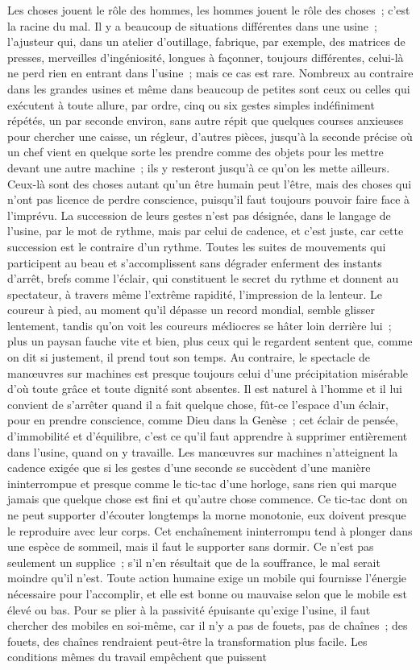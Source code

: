 \documentclass[french,twoside]{book} %
\begin{document}
Les choses jouent le rôle des hommes, les hommes jouent le rôle des choses ; c'est la racine du mal. Il y a beaucoup de situations différentes dans une usine ; l'ajusteur qui, dans un atelier d'outillage, fabrique, par exemple, des matrices de presses, merveilles d'ingéniosité, longues à façonner, toujours différentes, celui-là ne perd rien en entrant dans l'usine ; mais ce cas est rare. Nombreux au contraire dans les grandes usines et même dans beaucoup de petites sont ceux ou celles qui exécutent à toute allure, par ordre, cinq ou six gestes simples indéfiniment répétés, un par seconde environ, sans autre répit que quelques courses anxieuses pour chercher une caisse, un régleur, d'autres pièces, jusqu'à la seconde précise où un chef vient en quelque sorte les prendre comme des objets pour les mettre devant une autre machine ; ils y resteront jusqu'à ce qu'on les mette ailleurs. Ceux-là sont des choses autant qu'un être humain peut l'être, mais des choses qui n'ont pas licence de perdre conscience, puisqu'il faut toujours pouvoir faire face à l'imprévu. La succession de leurs gestes n'est pas désignée, dans le langage de l'usine, par le mot de rythme, mais par celui de cadence, et c'est juste, car cette succession est le contraire d'un rythme. Toutes les suites de mouvements qui participent au beau et s'accomplissent sans dégrader enferment des instants d'arrêt, brefs comme l'éclair, qui constituent le secret du rythme et donnent au spectateur, à travers même l'extrême rapidité, l'impression de la lenteur. Le coureur à pied, au moment qu'il dépasse un record mondial, semble glisser lentement, tandis qu'on voit les coureurs médiocres se hâter loin derrière lui ; plus un paysan fauche vite et bien, plus ceux qui le regardent sentent que, comme on dit si justement, il prend tout son temps. Au contraire, le spectacle de manœuvres sur machines est presque toujours celui d'une précipitation misérable d'où toute grâce et toute dignité sont absentes. Il est naturel à l'homme et il lui convient de s'arrêter quand il a fait quelque chose, fût-ce l'espace d'un éclair, pour en prendre conscience, comme Dieu dans la Genèse ; cet éclair de pensée, d'immobilité et d'équilibre, c'est ce qu'il faut apprendre à supprimer entièrement dans l'usine, quand on y travaille. Les manœuvres sur machines n'atteignent la cadence exigée que si les gestes d'une seconde se succèdent d'une manière ininterrompue et presque comme le tic-tac d'une horloge, sans rien qui marque jamais que quelque chose est fini et qu'autre chose commence. Ce tic-tac dont on ne peut supporter d'écouter longtemps la morne monotonie, eux doivent presque le reproduire avec leur corps. Cet enchaînement ininterrompu tend à plonger dans une espèce de sommeil, mais il faut le supporter sans dormir. Ce n'est pas seulement un supplice ; s'il n'en résultait que de la souffrance, le mal serait moindre qu'il n'est. Toute action humaine exige un mobile qui fournisse l'énergie nécessaire pour l'accomplir, et elle est bonne ou mauvaise selon que le mobile est élevé ou bas. Pour se plier à la passivité épuisante qu'exige l'usine, il faut chercher des mobiles en soi-même, car il n'y a pas de fouets, pas de chaînes ; des fouets, des chaînes rendraient peut-être la transformation plus facile. Les conditions mêmes du travail empêchent que puissent 
\end{document}
